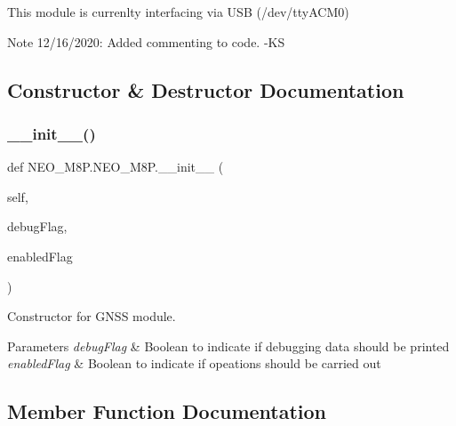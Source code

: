 This module is currenlty interfacing via U\+SB (/dev/tty\+A\+C\+M0) \begin{DoxyNote}{Note}
12/16/2020\+: Added commenting to code. -\/\+KS 
\end{DoxyNote}


\subsection{Constructor \& Destructor Documentation}
\mbox{\label{classNEO__M8P_1_1NEO__M8P_a5d5b2db5c78cf7bb3b716b0b0c97b63a}} 
\subsubsection{\texorpdfstring{\+\_\+\+\_\+init\+\_\+\+\_\+()}{\_\_init\_\_()}}
{\footnotesize\ttfamily def N\+E\+O\+\_\+\+M8\+P.\+N\+E\+O\+\_\+\+M8\+P.\+\_\+\+\_\+init\+\_\+\+\_\+ (\begin{DoxyParamCaption}\item[{}]{self,  }\item[{}]{debug\+Flag,  }\item[{}]{enabled\+Flag }\end{DoxyParamCaption})}



Constructor for G\+N\+SS module. 


\begin{DoxyParams}{Parameters}
{\em debug\+Flag} & Boolean to indicate if debugging data should be printed \\
\hline
{\em enabled\+Flag} & Boolean to indicate if opeations should be carried out \\
\hline
\end{DoxyParams}


\subsection{Member Function Documentation}
\mbox{\label{classNEO__M8P_1_1NEO__M8P_a41a9dab0d5eb74d6156a9c5da912435a}} 
